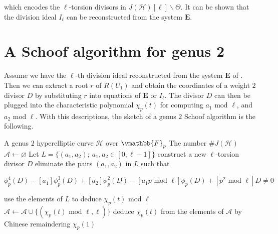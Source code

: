 which encodes the $\ell$-torsion divisors in $J(\mathcal{H})[\ell] \backslash \Theta$. It can be 
shown that the division ideal $I_\ell$ can be reconstructed from the system $\mathbf{E}$.










\section{A Schoof algorithm for genus 2}

Assume we have the $\ell$-th division ideal reconstructed from the system $\mathbf{E}$ of 
. Then we can extract a root $r$ of $R(U_1)$ and obtain the 
coordinates of a weight $2$ divisor $D$ by substituting $r$ into equations of $\mathbf{E}$ or 
$I_\ell$. The divisor $D$ can then be plugged into the characteristic polynomial $\chi_p(t)$ for 
computing $a_1 \text{ mod } \ell$, and $a_2 \text{ mod } \ell$. With this descriptions, the sketch 
of a genus $2$ Schoof algorithm is the following.

\begin{algorithm}
\label{algorithm:genus2-Schoof}
\begin{algorithmic}[1]
\REQUIRE A genus $2$ hyperelliptic curve $\mathcal{H}$ over $\vmathbb{F}_p$
\ENSURE  The number $\#J(\mathcal{H})$
\STATE $\mathcal{A} \leftarrow \varnothing$
	\STATE Let $L = \{ (a_1, a_2); \: a_1, a_2 \in [0, \ell - 1]\}$
		\STATE construct a new $\ell$-torsion divisor $D$
		\STATE eliminate the pairs $(a_1, a_2)$ in $L$ such that \\
		\begin{center}
		 $\phi_p^{4}(D) - [a_1]\phi_p^{3}(D) + [a_2]\phi_p^2(D) - [a_1p \text{ mod } \ell]\phi_p(D) 
+ [p^2 \text{ mod } \ell]D \ne 0$
		\end{center}
	\ENDWHILE
	\STATE use the elements of $L$ to deduce $\chi_p(t) \text{ mod } \ell$
	\STATE $\mathcal{A} \leftarrow \mathcal{A} \cup \{ (\chi_p(t) \text{ mod } \ell, \ell) \}$
\ENDFOR
\STATE deduce $\chi_p(t)$ from the elements of $\mathcal{A}$ by Chinese remaindering
\RETURN $\chi_p(1)$
\end{algorithmic}
\end{algorithm}

